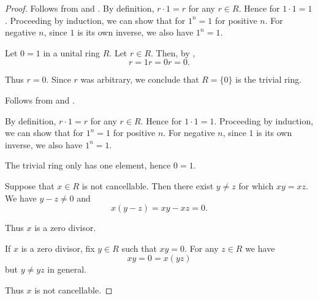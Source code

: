 \begin{proof}
   Follows from  and .
   By definition, \( r \cdot 1 = r \) for any \( r \in R \). Hence for \( 1 \cdot 1 = 1 \). Proceeding by induction\IND, we can show that for \( 1^n = 1 \) for positive \( n \). For negative \( n \), since \( 1 \) is its own inverse, we also have \( 1^n = 1 \).

  Let \( 0 = 1 \) in a unital ring \( R \). Let \( r \in R \). Then, by ,
  \begin{equation*}
    r = 1r = 0r = 0.
  \end{equation*}

  Thus \( r = 0 \). Since \( r \) was arbitrary, we conclude that \( R = \{ 0 \} \) is the trivial ring.

   Follows from  and .

   By definition, \( r \cdot 1 = r \) for any \( r \in R \). Hence for \( 1 \cdot 1 = 1 \). Proceeding by induction\IND, we can show that for \( 1^n = 1 \) for positive \( n \). For negative \( n \), since \( 1 \) is its own inverse, we also have \( 1^n = 1 \).

   The trivial ring only has one element, hence \( 0 = 1 \).

  Suppose that \( x \in R \) is not cancellable. Then there exist \( y \neq z \) for which \( xy = xz \). We have \( y - z \neq 0 \) and
  \begin{equation*}
    x(y - z) = xy - xz = 0.
  \end{equation*}

  Thus \( x \) is a zero divisor.

   If \( x \) is a zero divisor, fix \( y \in R \) such that \( xy = 0 \). For any \( z \in R \) we have
  \begin{equation*}
    xy = 0 = x(yz)
  \end{equation*}
  but \( y \neq yz \) in general.

  Thus \( x \) is not cancellable.
\end{proof}

